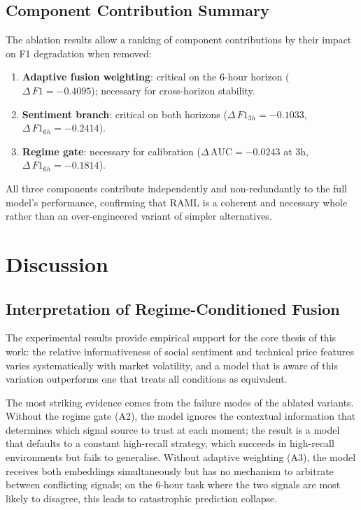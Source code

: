 \documentclass[journal]{IEEEtran}
\newcommand{\raml}{\textsc{RAML}}
\newcommand{\delt}[1]{\Delta\,{#1}}
\begin{document}
\subsection{Component Contribution Summary}
The ablation results allow a ranking of component contributions by their
impact on F1 degradation when removed:
\begin{enumerate}
  \item \textbf{Adaptive fusion weighting}: critical on the 6-hour horizon
        ($\delt{F1} = -0.4095$); necessary for cross-horizon stability.
  \item \textbf{Sentiment branch}: critical on both horizons
        ($\delt{F1}_{3h} = -0.1033$, $\delt{F1}_{6h} = -0.2414$).
  \item \textbf{Regime gate}: necessary for calibration ($\delt{\mathrm{AUC}}
        = -0.0243$ at 3h, $\delt{F1}_{6h} = -0.1814$).
\end{enumerate}
All three components contribute independently and non-redundantly to the full
model's performance, confirming that \raml{} is a coherent and necessary whole
rather than an over-engineered variant of simpler alternatives.

\section{Discussion}
\label{sec:discussion}

\subsection{Interpretation of Regime-Conditioned Fusion}
The experimental results provide empirical support for the core thesis of this
work: the relative informativeness of social sentiment and technical price
features varies systematically with market volatility, and a model that is
aware of this variation outperforms one that treats all conditions as equivalent.

The most striking evidence comes from the failure modes of the ablated variants.
Without the regime gate (A2), the model ignores the contextual information that
determines which signal source to trust at each moment; the result is a model
that defaults to a constant high-recall strategy, which succeeds in high-recall
environments but fails to generalise. Without adaptive weighting (A3), the model
receives both embeddings simultaneously but has no mechanism to arbitrate between
conflicting signals; on the 6-hour task where the two signals are most likely
to disagree, this leads to catastrophic prediction collapse.
\end{document}
